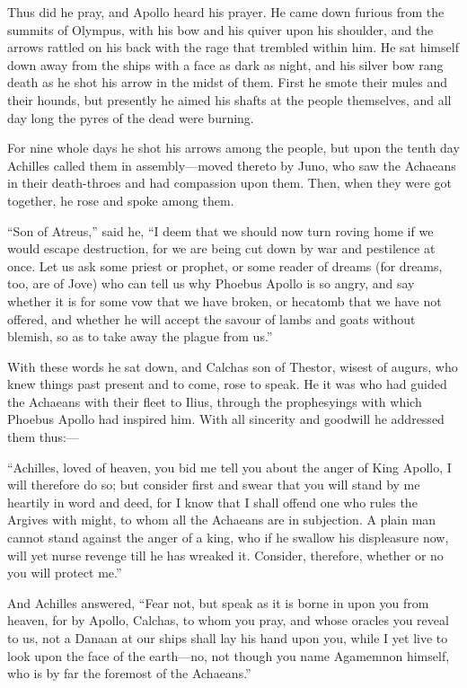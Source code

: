 Thus did he pray, and Apollo heard his prayer. He came down furious from
the summits of Olympus, with his bow and his quiver upon his shoulder, and
the arrows rattled on his back with the rage that trembled within him. He
sat himself down away from the ships with a face as dark as night, and his
silver bow rang death as he shot his arrow in the midst of them. First he
smote their mules and their hounds, but presently he aimed his shafts at
the people themselves, and all day long the pyres of the dead were
burning.

For nine whole days he shot his arrows among the people, but upon the
tenth day Achilles called them in assembly—moved thereto by Juno,
who saw the Achaeans in their death-throes and had compassion upon them.
Then, when they were got together, he rose and spoke among them.

“Son of Atreus,” said he, “I deem that we should now turn roving home if
we would escape destruction, for we are being cut down by war and
pestilence at once. Let us ask some priest or prophet, or some reader of
dreams (for dreams, too, are of Jove) who can tell us why Phoebus Apollo
is so angry, and say whether it is for some vow that we have broken, or
hecatomb that we have not offered, and whether he will accept the savour
of lambs and goats without blemish, so as to take away the plague from
us.”

With these words he sat down, and Calchas son of Thestor, wisest of
augurs, who knew things past present and to come, rose to speak. He it was
who had guided the Achaeans with their fleet to Ilius, through the
prophesyings with which Phoebus Apollo had inspired him. With all
sincerity and goodwill he addressed them thus:—

“Achilles, loved of heaven, you bid me tell you about the anger of King
Apollo, I will therefore do so; but consider first and swear that you will
stand by me heartily in word and deed, for I know that I shall offend one
who rules the Argives with might, to whom all the Achaeans are in
subjection. A plain man cannot stand against the anger of a king, who if
he swallow his displeasure now, will yet nurse revenge till he has wreaked
it. Consider, therefore, whether or no you will protect me.”

And Achilles answered, “Fear not, but speak as it is borne in upon you
from heaven, for by Apollo, Calchas, to whom you pray, and whose oracles
you reveal to us, not a Danaan at our ships shall lay his hand upon you,
while I yet live to look upon the face of the earth—no, not though
you name Agamemnon himself, who is by far the foremost of the Achaeans.”

